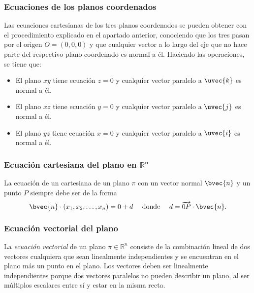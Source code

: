 \documentclass{fmbnotes}
\begin{document}
\subsubsection{ Ecuaciones de los planos coordenados}

Las ecuaciones cartesianas de los tres planos coordenados se pueden obtener con el procedimiento explicado en el apartado anterior, conociendo que los tres pasan por el origen \( O=(0,0,0) \) y que cualquier vector a lo largo del eje que no hace parte del respectivo plano coordenado es normal a él. Haciendo las operaciones, se tiene que:
\begin{itemize}
    \item El plano \( x y \) tiene ecuación \( z=0 \) y cualquier vector paralelo a \( \uvec{k} \) es normal a él.
	\item El plano \( x z \) tiene ecuación \( y=0 \) y cualquier vector paralelo a \( \uvec{j} \) es normal a él.
	\item El plano \( y z \) tiene ecuación \( x=0 \) y cualquier vector paralelo a \( \uvec{i} \) es normal a él.
\end{itemize}

\subsubsection[Ecuación cartesiana del plano en \(\mathbb{R}^{n}\)]{Ecuación cartesiana del plano en \(\bm{\mathbb{R}^{n}}\)}

La ecuación de un cartesiana de un plano \( \pi \) con un vector normal \( \bvec{n} \) y un punto \( P \) siempre debe ser de la forma
\[ \bvec{n} \cdot\left(x_{1}, x_{2}, \ldots, x_{n}\right)=0+d \quad \text { donde } \quad d=\overrightarrow{0 P} \cdot \bvec{n} .\]

\subsubsection{Ecuación vectorial del plano}
La \emph{ecuación vectorial} de un plano \(\pi\in\mathbb{R}^{n}\) consiste de la combinación lineal de dos vectores cualquiera que sean linealmente independientes y se encuentran en el plano más un punto en el plano. Los vectores deben ser linealmente independientes porque dos vectores paralelos no pueden describir un plano, al ser múltiplos escalares entre sí y estar en la misma recta.
\end{document}
